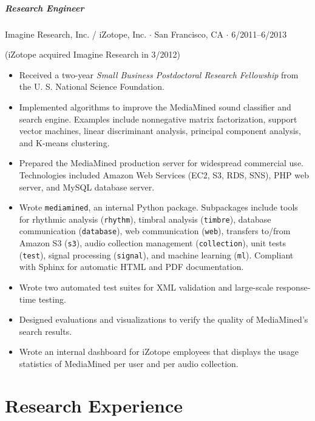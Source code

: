 \documentclass[10pt,letterpaper]{article}
\begin{document}
\subparagraph{Research Engineer}
Imagine Research, Inc. / iZotope, Inc. $\cdot$ San Francisco, CA $\cdot$ 6/2011--6/2013 

(iZotope acquired Imagine Research in 3/2012)
\begin{itemize}
    \item Received a two-year \textit{Small Business Postdoctoral Research Fellowship} from the U. S. National Science Foundation.
    \item Implemented algorithms to improve the MediaMined sound classifier and search engine. Examples include nonnegative matrix factorization, support vector machines, linear discriminant analysis, principal component analysis, and K-means clustering.
    \item Prepared the MediaMined production server for widespread commercial use. Technologies included Amazon Web Services (EC2, S3, RDS, SNS), PHP web server, and MySQL database server.
    \item Wrote \texttt{mediamined}, an internal Python package. Subpackages include tools for rhythmic analysis (\texttt{rhythm}), timbral analysis (\texttt{timbre}), database communication (\texttt{database}), web communication (\texttt{web}), transfers to/from Amazon S3 (\texttt{s3}), audio collection management (\texttt{collection}), unit tests (\texttt{test}), signal processing (\texttt{signal}), and machine learning (\texttt{ml}). Compliant with Sphinx for automatic HTML and PDF documentation.
    \item Wrote two automated test suites for XML validation and large-scale response-time testing.
    \item Designed evaluations and visualizations to verify the quality of MediaMined's search results.
    \item Wrote an internal dashboard for iZotope employees that displays the usage statistics of MediaMined per user and per audio collection.
\end{itemize}


\section*{Research Experience}
\end{document}

